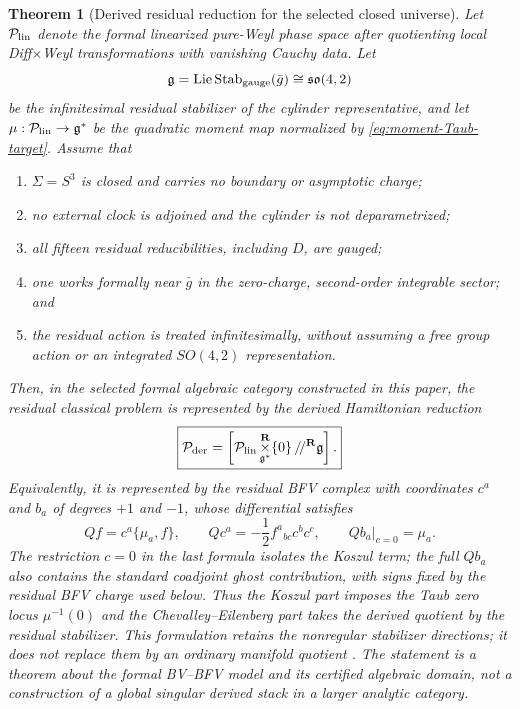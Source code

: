 \documentclass[11pt]{article}
\newtheorem{theorem}{Theorem}[section]
\theoremstyle{definition}
\theoremstyle{remark}
\newcommand{\g}{\mathfrak g}
\begin{document}
\begin{theorem}[Derived residual reduction for the selected closed universe]
\label{thm:derived-residual-reduction}
Let $\mathcal P_{\rm lin}$ denote the formal linearized pure-Weyl phase
space after quotienting local Diff$\times$Weyl transformations with
vanishing Cauchy data.  Let
\begin{equation}
 \g=\operatorname{Lie}\operatorname{Stab}_{\rm gauge}(\bar g)
   \cong\mathfrak{so}(4,2)
\end{equation}
be the infinitesimal residual stabilizer of the cylinder representative,
and let $\mu:\mathcal P_{\rm lin}\to\g^*$ be the quadratic moment map
normalized by \eqref{eq:moment-Taub-target}.  Assume that
\begin{enumerate}
\item $\Sigma=S^3$ is closed and carries no boundary or asymptotic charge;
\item no external clock is adjoined and the cylinder is not deparametrized;
\item all fifteen residual reducibilities, including $D$, are gauged;
\item one works formally near $\bar g$ in the zero-charge, second-order
integrable sector; and
\item the residual action is treated infinitesimally, without assuming a
free group action or an integrated $SO(4,2)$ representation.
\end{enumerate}
Then, in the selected formal algebraic category constructed in this paper,
the residual classical problem is represented by the derived Hamiltonian
reduction
\begin{equation}\label{eq:derived-residual-reduction}
 \boxed{
 \mathcal P_{\rm der}
 =\left[\mathcal P_{\rm lin}
   \mathop{\times}^{\mathbf R}_{\g^*}\{0\}\,/\!/^{\mathbf R}\g\right].}
\end{equation}
Equivalently, it is represented by the residual BFV complex with coordinates
$c^a$ and $b_a$ of degrees $+1$ and $-1$, whose differential satisfies
\begin{equation}\label{eq:derived-residual-BFV}
 Qf=c^a\{\mu_a,f\},\qquad
 Qc^a=-\frac12f^a{}_{bc}c^bc^c,\qquad
 Qb_a\big|_{c=0}=\mu_a.
\end{equation}
The restriction $c=0$ in the last formula isolates the Koszul term; the full
$Qb_a$ also contains the standard coadjoint ghost contribution, with signs
fixed by the residual BFV charge used below.
Thus the Koszul part imposes the Taub zero locus $\mu^{-1}(0)$ and the
Chevalley--Eilenberg part takes the derived quotient by the residual
stabilizer.  This formulation retains the nonregular stabilizer directions;
it does not replace them by an ordinary manifold quotient
\cite{CattaneoMnevReshetikhin}.  The statement is a theorem about the formal
BV--BFV model and its certified algebraic domain, not a construction of a
global singular derived stack in a larger analytic category.


\end{theorem}
\end{document}
